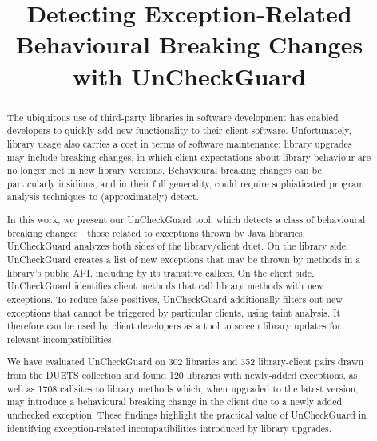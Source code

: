 \documentclass[conference]{IEEEtran}
\begin{document}
	\title {Detecting Exception-Related Behavioural Breaking Changes with UnCheckGuard}

    \author{
    }

    \maketitle
    \thispagestyle{plain}
    \pagestyle{plain}

    \begin{abstract}
      The ubiquitous use of third-party libraries in software development has enabled developers to quickly add
      new functionality to their client software. Unfortunately, library usage also carries a cost in
      terms of software maintenance: library upgrades may include breaking changes, in which client expectations
      about library behaviour are no longer met in new library versions. Behavioural breaking
      changes can be particularly insidious, and in their full generality, could require sophisticated program
      analysis techniques to (approximately) detect.

      In this work, we present our UnCheckGuard tool, which detects a class of behavioural breaking changes---those
      related to exceptions thrown by Java libraries. UnCheckGuard analyzes both sides of the library/client
      duet. On the library side, UnCheckGuard creates a list of new exceptions that may be thrown by methods
      in a library's public API, including by its transitive callees. On the client side, UnCheckGuard identifies
      client methods that call library methods with new exceptions. To reduce false positives, UnCheckGuard
      additionally filters out new exceptions that cannot be triggered by particular clients, using taint analysis. It therefore can be
      used by client developers as a tool to screen library updates for relevant incompatibilities.

      We have evaluated UnCheckGuard on 302 libraries and 352 library-client pairs drawn from the DUETS collection
      and found 120 libraries with newly-added exceptions, as well as 1708 callsites to library methods which,
      when upgraded to the latest version, may introduce
      a behavioural breaking change in the client due to a newly added unchecked exception. These findings
      highlight the practical value of UnCheckGuard in identifying exception-related incompatibilities
      introduced by library upgrades.


    \end{abstract}
    
\end{document}

